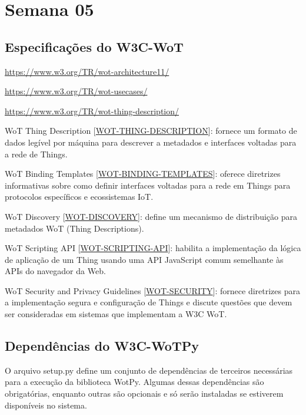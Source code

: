 
\section{Semana 05}

\subsection{Especificações do W3C-WoT}

\url{https://www.w3.org/TR/wot-architecture11/}

\url{https://www.w3.org/TR/wot-usecases/}

\url{https://www.w3.org/TR/wot-thing-description/}

WoT Thing Description [\href{https://www.w3.org/TR/wot-thing-description11/}{WOT-THING-DESCRIPTION}]: fornece um formato de dados legível por máquina para descrever a metadados e interfaces voltadas para a rede de Things.

WoT Binding Templates [\href{https://www.w3.org/TR/wot-binding-templates/}{WOT-BINDING-TEMPLATES}]: oferece diretrizes informativas sobre como definir interfaces voltadas para a rede em Things para protocolos específicos e ecossistemas IoT.

WoT Discovery [\href{https://www.w3.org/TR/wot-discovery/}{WOT-DISCOVERY}]: define um mecanismo de distribuição para metadados WoT (Thing Descriptions).

WoT Scripting API [\href{https://www.w3.org/TR/wot-scripting-api/}{WOT-SCRIPTING-API}]: habilita a implementação da lógica de aplicação de um Thing usando uma API JavaScript comum semelhante às APIs do navegador da Web.

WoT Security and Privacy Guidelines [\href{https://www.w3.org/TR/wot-security/}{WOT-SECURITY}]: fornece diretrizes para a implementação segura e configuração de Things e discute questões que devem ser consideradas em sistemas que implementam a W3C WoT.

\subsection{Dependências do W3C-WoTPy}

O arquivo setup.py define um conjunto de dependências de terceiros necessárias para a execução da biblioteca WotPy. Algumas dessas dependências são obrigatórias, enquanto outras são opcionais e só serão instaladas se estiverem disponíveis no sistema.


